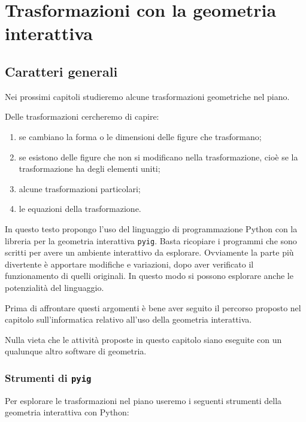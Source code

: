 
\chapter{Trasformazioni con la geometria interattiva}

\section{Caratteri generali}
\label{sec:caratterigenerali}

Nei prossimi capitoli studieremo alcune trasformazioni geometriche nel piano.

Delle trasformazioni cercheremo di capire:
\begin{enumerate} [noitemsep]
\item se cambiano la forma o le dimensioni delle figure che trasformano;
\item se esistono delle figure che non si modificano nella trasformazione,
 cioè se la trasformazione ha degli elementi uniti;
\item alcune trasformazioni particolari;
\item le equazioni della trasformazione.
\end{enumerate}

In questo testo propongo l'uso del linguaggio di programmazione Python con 
la libreria per la geometria interattiva \texttt{pyig}. 
Basta ricopiare i programmi che sono scritti per 
avere un ambiente interattivo da esplorare. 
Ovviamente la parte più divertente è apportare modifiche e variazioni, 
dopo aver verificato il funzionamento di quelli originali. 
In questo modo si possono esplorare anche le potenzialità del linguaggio.

Prima di affrontare questi argomenti è bene aver seguito il percorso proposto 
nel capitolo sull'informatica relativo all'uso della geometria interattiva.

Nulla vieta che le attività proposte in questo capitolo siano eseguite con 
un qualunque altro software di geometria.

\subsection{Strumenti di \texttt{pyig}}

Per esplorare le trasformazioni nel piano useremo i seguenti strumenti della
geometria interattiva con Python:

